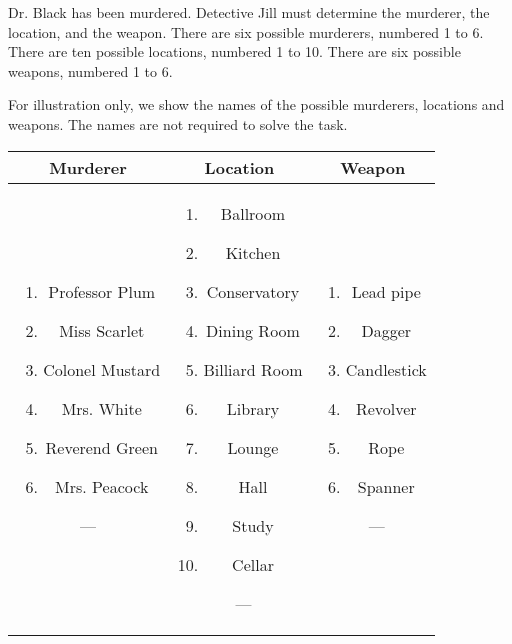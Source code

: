 Dr. Black has been murdered. Detective Jill must determine the murderer, the location, and the weapon. There are six possible murderers, numbered 1 to 6. There are ten possible locations, numbered 1 to 10. There are six possible weapons, numbered 1 to 6.

For illustration only, we show the names of the possible murderers, locations and weapons. The names are not required to solve the task.

\begin{center}
\renewcommand{\arraystretch}{1.5}
\begin{tabular}{|c|c|c|}
\hline
Murderer & Location & Weapon \\
\hline
\parbox{5cm}{\centering \vspace{2mm}
\begin{enumerate}
\item Professor Plum
\item Miss Scarlet
\item Colonel Mustard
\item Mrs. White
\item Reverend Green
\item Mrs. Peacock
\end{enumerate}---\\
\vspace{2mm}} & 
\parbox{5cm}{\centering \vspace{2mm}
\begin{enumerate}
\item Ballroom
\item Kitchen
\item Conservatory
\item Dining Room
\item Billiard Room
\item Library
\item Lounge
\item Hall
\item Study
\item Cellar
\end{enumerate}~--- \\
\vspace{2mm}} &
\parbox{5cm}{\centering \vspace{2mm}
\begin{enumerate}
\item Lead pipe
\item Dagger
\item Candlestick
\item Revolver
\item Rope
\item Spanner
\end{enumerate}~--- \\
\vspace{2mm}} \\
\hline
\end{tabular}
\end{center}



